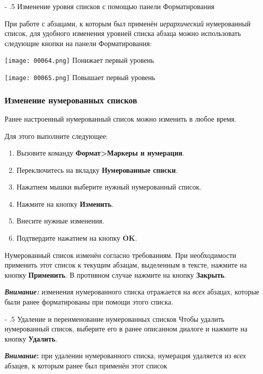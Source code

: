﻿\documentclass[a4paper,10pt]{article}
\makeatletter
\renewcommand\paragraph{%
   \@startsection{paragraph}{4}{0mm}%
      {-\baselineskip}%
      {.5\baselineskip}%
      {\normalfont\normalsize\bfseries}}
\makeatother
\begin{document}
\paragraph{Изменение уровня списков с помощью панели Форматирования}

При работе с абзацами, к которым был применён \textit{иерархический} нумерованный список, для удобного изменения уровней списка абзаца можно использовать следующие кнопки на панели Форматирования:

\texttt{[image: 00064.png]} Понижает первый уровень

\texttt{[image: 00065.png]} Повышает первый уровень

\subsubsection{Изменение нумерованных списков}
Ранее настроенный нумерованный список можно изменить в любое время.

Для этого выполните следующее:
\begin{enumerate}
 \item Вызовите команду \textbf{Формат>Маркеры и нумерация}.
 \item Переключитесь на вкладку \textbf{Нумерованные списки}.
 \item Нажатием мышки выберите нужный нумерованный список.
 \item Нажмите на кнопку \textbf{Изменить}.
 \item Внесите нужные изменения.
 \item Подтвердите нажатием на кнопку \textbf{OK}.
\end{enumerate}

Нумерованный список изменён согласно требованиям. При необходимости применить этот список к текущим абзацам, выделенным в тексте, нажмите на кнопку \textbf{Применить}. В противном случае нажмите на кнопку \textbf{Закрыть}.

\textbf{\textit{Внимание:}} изменения нумерованного списка отражается на \textit{всех} абзацах, которые были ранее форматированы при помощи этого списка.

\paragraph{Удаление и переименование нумерованных списков}
Чтобы удалить нумерованный список, выберите его в ранее описанном диалоге и нажмите на кнопку \textbf{Удалить}.
\begin{mdframed}[backgroundcolor=blue!10]
\textbf{\textit{Внимание}:} при удалении нумерованного списка, нумерация удаляется из \textit{всех} абзацев, к которым ранее был применён этот список
\end{mdframed}
\end{document}
